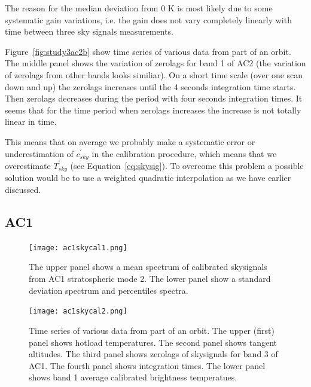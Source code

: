 The reason for the median deviation from 0 K is most likely due to 
some systematic gain variations, i.e. the gain does not vary
completely linearly with time between three sky signals
measurements.


Figure~\ref{fig:study3ac2b} show time series of various data from 
part of an orbit.
The middle panel shows the variation of zerolags for band 1
of AC2 (the variation of zerolags from other bands looks similiar).
On a short time scale (over one scan down and up) the zerolags increases
until the 4 seconds integration time starts. Then zerolags decreases
during the period with four seconds integration times. 
It seems that for the time period when zerolags increases
the increase is not totally linear in time.

This means that on average we probably make a systematic
error or underestimation of \(c^{'}_{sky}\) in the calibration
procedure, which means that we overestimate \(T^{'}_{sky}\)
(see Equation~\ref{eq:skysig}).
To overcome this problem a possible solution would be to use a weighted
quadratic interpolation as we have earlier discussed.

\clearpage
\newpage
\subsection{AC1}

\begin{figure}[!t]
\centering
\texttt{[image: ac1skycal1.png]}\\
\caption{The upper panel shows a mean spectrum of calibrated
skysignals from AC1 stratospheric mode 2. 
The lower panel show a standard deviation spectrum
and percentiles spectra.}
\label{fig:study3ac1a}
\end{figure}

\begin{figure}[!t]
\centering
\texttt{[image: ac1skycal2.png]}\\
\caption{Time series of various data from part of an orbit.
The upper (first) panel shows hotload temperatures.
The second panel shows tangent altitudes.
The third panel shows zerolags of skysignals for band 3 of AC1.
The fourth panel shows integration times.
The lower panel shows band 1 average calibrated brightness temperatues.}
\label{fig:study3ac1b}
\end{figure}

